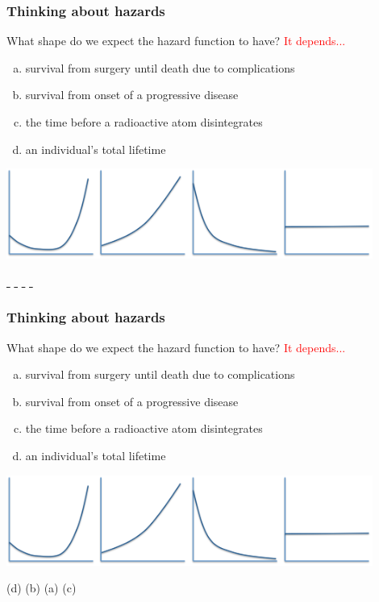 \documentclass[10pt,t]{beamer}
\begin{document}
\begin{frame}
\frametitle{Thinking about hazards}
What shape do we expect the hazard function to have? \textcolor{red}{It depends...}
\begin{enumerate}[(a)]
\item survival from surgery until death due to complications
\item survival from onset of a progressive disease
\item the time before a radioactive atom disintegrates
\item an individual's total lifetime
\end{enumerate}
\begin{center}
\includegraphics[width = 0.9\textwidth]{figs/hazard_examples.png}

\underline{\,\phantom{right}\,} \hspace{1.5cm} \underline{\,\phantom{right}\,} \hspace{1.5cm} \underline{\,\phantom{right}\,} \hspace{1.5cm} \underline{\,\phantom{right}\,}
\end{center}
\end{frame}

\begin{frame}
	\frametitle{Thinking about hazards}
	What shape do we expect the hazard function to have? \textcolor{red}{It depends...}
	\begin{enumerate}[(a)]
		\item survival from surgery until death due to complications
		\item survival from onset of a progressive disease
		\item the time before a radioactive atom disintegrates
		\item an individual's total lifetime
	\end{enumerate}
	\begin{center}
		\includegraphics[width = 0.9\textwidth]{figs/hazard_examples.png}
		
		(d) \hspace{1.5cm} (b) \hspace{1.5cm} (a) \hspace{1.5cm} (c)
	\end{center}
\end{frame}
\end{document}
